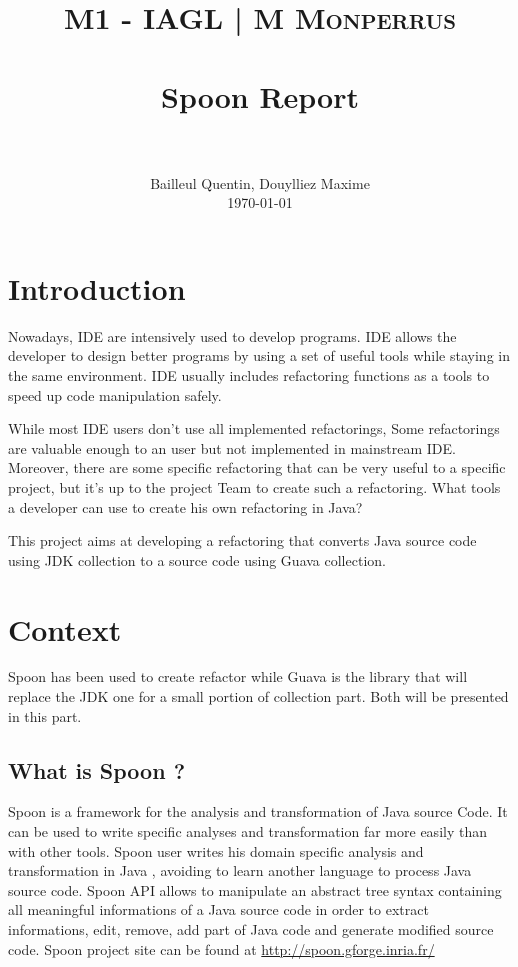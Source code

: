 \documentclass[paper=a4, fontsize=11pt]{scrartcl}
\title{
  \usefont{OT1}{bch}{b}{n}
  \normalfont \normalsize \textsc{M1 - IAGL | M Monperrus}
  \\ [25pt]
  \horrule{0.5pt} \\[0.4cm]
  \huge Spoon Report\\
  \horrule{2pt} \\[0.5cm]
}
\author{
  \normalfont \normalsize
  Bailleul Quentin, Douylliez Maxime\\[-3pt]\normalsize
        \today
}
\date{}
\numberwithin{equation}{section}%
\numberwithin{figure}{section}%
\numberwithin{table}{section}%
\begin{document}
\maketitle
\tableofcontents



\newpage

\section{Introduction}
Nowadays, IDE are intensively used to develop programs.  IDE allows
the developer to design better programs by using a set of useful tools
while staying in the same environment. IDE usually includes
refactoring functions as a tools to speed up code manipulation safely.


While most IDE users don't use all implemented refactorings, Some
refactorings are valuable enough to an user but not implemented in
mainstream IDE. Moreover, there are some specific refactoring that can
be very useful to a specific project, but it's up to the project Team
to create such a refactoring. What tools a developer can use to create
his own refactoring in Java?

This project aims at developing a refactoring that converts Java
source code using JDK collection to a source code using Guava
collection.



\section{Context}
Spoon has been used to create refactor while Guava is the library that
will replace the JDK one for a small portion of collection part. Both
will be presented in this part.  


\subsection{What is Spoon ?}
Spoon is a framework for the analysis and transformation of Java
source Code. It can be used to write specific analyses and
transformation far more easily than with other tools.  Spoon user
writes his domain specific analysis and transformation in Java ,
avoiding to learn another language to process Java source code. Spoon
API allows to manipulate an abstract tree syntax containing all
meaningful informations of a Java source code in order to extract
informations, edit, remove, add part of Java code and generate
modified source code.
Spoon project site can be found at \url{http://spoon.gforge.inria.fr/}
\end{document}
